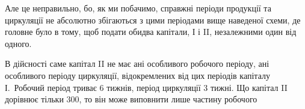 \noindent{}Але це неправильно, бо, як ми побачимо, справжні періоди продукції
та циркуляції не абсолютно збігаються з цими періодами вище наведеної
схеми, де головне було в тому, щоб подати обидва капітали, І і II, незалежними
один від одного.

В дійсності саме капітал II не має ані особливого робочого періоду, ані особливого
періоду циркуляції, відокремлених від цих періодів капіталу І.~Робочий
період триває 6 тижнів, період циркуляції 3 тижні. Що капітал II дорівнює
тільки 300, то він може виповнити лише частину робочого
\parbreak{}  %
